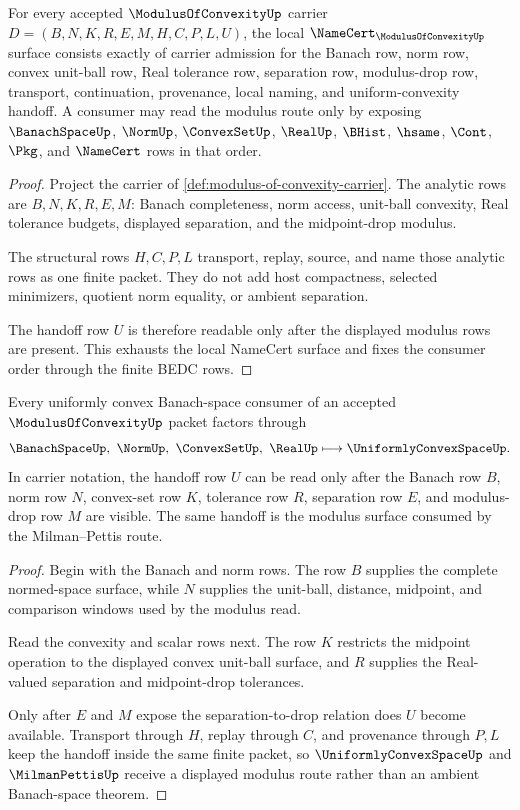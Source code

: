 \begin{theorem}
\label{thm:modulus-of-convexity-namecert-obligations}
For every accepted $\ModulusOfConvexityUp$ carrier $D=(B,N,K,R,E,M,H,C,P,L,U)$, the local $\NameCert_{\ModulusOfConvexityUp}$ surface consists exactly of carrier admission for the Banach row, norm row, convex unit-ball row, Real tolerance row, separation row, modulus-drop row, transport, continuation, provenance, local naming, and uniform-convexity handoff. A consumer may read the modulus route only by exposing $\BanachSpaceUp$, $\NormUp$, $\ConvexSetUp$, $\RealUp$, $\BHist$, $\hsame$, $\Cont$, $\Pkg$, and $\NameCert$ rows in that order.
\end{theorem}
\begin{proof}
Project the carrier of \autoref{def:modulus-of-convexity-carrier}. The analytic rows are $B,N,K,R,E,M$: Banach completeness, norm access, unit-ball convexity, Real tolerance budgets, displayed separation, and the midpoint-drop modulus.

The structural rows $H,C,P,L$ transport, replay, source, and name those analytic rows as one finite packet. They do not add host compactness, selected minimizers, quotient norm equality, or ambient separation.

The handoff row $U$ is therefore readable only after the displayed modulus rows are present. This exhausts the local NameCert surface and fixes the consumer order through the finite BEDC rows.
\end{proof}

\begin{theorem}
\label{thm:modulus-of-convexity-uniform-convexity-handoff}
Every uniformly convex Banach-space consumer of an accepted $\ModulusOfConvexityUp$ packet factors through
$$
\BanachSpaceUp,\ \NormUp,\ \ConvexSetUp,\ \RealUp
\longmapsto
\UniformlyConvexSpaceUp .
$$
In carrier notation, the handoff row $U$ can be read only after the Banach row $B$, norm row $N$, convex-set row $K$, tolerance row $R$, separation row $E$, and modulus-drop row $M$ are visible. The same handoff is the modulus surface consumed by the Milman--Pettis route.
\end{theorem}
\begin{proof}
Begin with the Banach and norm rows. The row $B$ supplies the complete normed-space surface, while $N$ supplies the unit-ball, distance, midpoint, and comparison windows used by the modulus read.

Read the convexity and scalar rows next. The row $K$ restricts the midpoint operation to the displayed convex unit-ball surface, and $R$ supplies the Real-valued separation and midpoint-drop tolerances.

Only after $E$ and $M$ expose the separation-to-drop relation does $U$ become available. Transport through $H$, replay through $C$, and provenance through $P,L$ keep the handoff inside the same finite packet, so $\UniformlyConvexSpaceUp$ and $\MilmanPettisUp$ receive a displayed modulus route rather than an ambient Banach-space theorem.
\end{proof}

